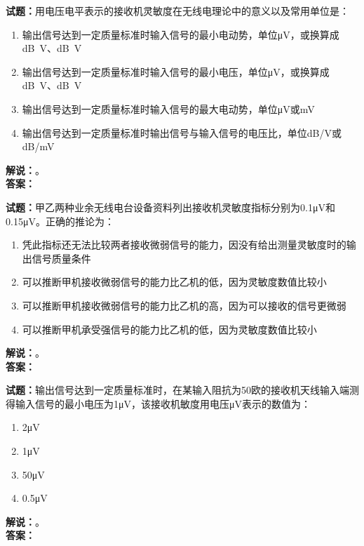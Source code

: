 \documentclass{ctexbook}
\begin{document}
\noindent\textbf{试题：}用电压电平表示的接收机灵敏度在无线电理论中的意义以及常用单位是：
\begin{enumerate}[leftmargin=3em]
  \item 输出信号达到一定质量标准时输入信号的最小电动势，单位μV，或换算成\unit[qualifier-mode=combine]{\deci\bel{}}V、\unit[qualifier-mode=combine]{\deci\bel{}}V
  \item 输出信号达到一定质量标准时输入信号的最小电压，单位μV，或换算成\unit[qualifier-mode=combine]{\deci\bel{}}V、\unit[qualifier-mode=combine]{\deci\bel{}}V
  \item 输出信号达到一定质量标准时输入信号的最大电动势，单位μV或mV
  \item 输出信号达到一定质量标准时输出信号与输入信号的电压比，单位dB/V或dB/mV
\end{enumerate}
\noindent\textbf{解说：}\textbf{}。\\\noindent\textbf{答案：}

\bigskip

\noindent\textbf{试题：}甲乙两种业余无线电台设备资料列出接收机灵敏度指标分别为0.1μV和0.15μV。正确的推论为：
\begin{enumerate}[leftmargin=3em]
  \item 凭此指标还无法比较两者接收微弱信号的能力，因没有给出测量灵敏度时的输出信号质量条件
  \item 可以推断甲机接收微弱信号的能力比乙机的低，因为灵敏度数值比较小
  \item 可以推断甲机接收微弱信号的能力比乙机的高，因为可以接收的信号更微弱
  \item 可以推断甲机承受强信号的能力比乙机的低，因为灵敏度数值比较小
\end{enumerate}
\noindent\textbf{解说：}\textbf{}。\\\noindent\textbf{答案：}

\bigskip

\noindent\textbf{试题：}输出信号达到一定质量标准时，在某输入阻抗为50欧的接收机天线输入端测得输入信号的最小电压为1μV，该接收机敏度用电压μV表示的数值为：
\begin{enumerate}[leftmargin=3em]
  \item 2μV
  \item 1μV
  \item 50μV
  \item 0.5μV
\end{enumerate}
\noindent\textbf{解说：}\textbf{}。\\\noindent\textbf{答案：}

\bigskip
\end{document}
